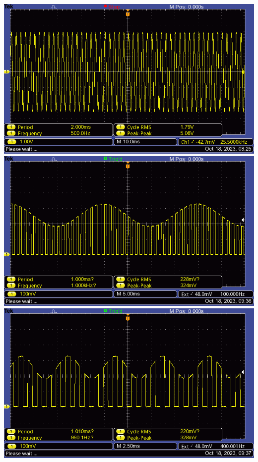 \includegraphics[width=0.5\linewidth]{images/lab_4/Hardcopies/./F0005TEK.png}
\includegraphics[width=0.5\linewidth]{images/lab_4/Hardcopies/./F0006TEK.png}
\includegraphics[width=0.5\linewidth]{images/lab_4/Hardcopies/./F0007TEK.png}